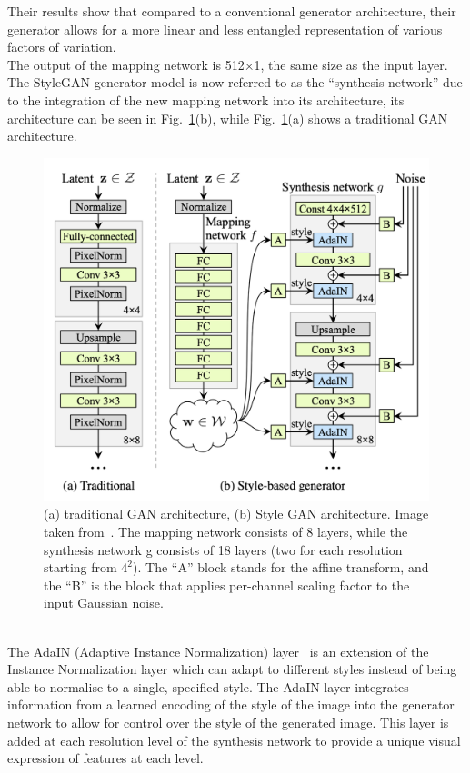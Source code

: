 %
Their results show that compared to a conventional generator architecture, their generator allows for a more linear and less entangled representation of various factors of variation.\\
The output of the mapping network is 512×1, the same size as the input layer. The StyleGAN generator model is now referred to as the “synthesis network” due to the integration of the new mapping network into its architecture, its architecture can be seen in Fig.~\ref{fig:StyleGAN architecture}(b), while Fig.~\ref{fig:StyleGAN architecture}(a) shows a traditional GAN architecture.
\begin{figure}[!ht]
\centering
  \includegraphics[scale=0.5]{figures/styleGAN-generator.png}
  \caption{(a) traditional GAN architecture, (b) Style GAN architecture. Image taken from~\cite{StyleGAN}. The mapping network consists of 8 layers, while the synthesis network g consists of 18 layers (two for each resolution starting from $4^2$). The “A” block stands for the affine transform, and the “B” is the block that applies per-channel scaling factor to the input Gaussian noise.}
  \label{fig:StyleGAN architecture}
\end{figure}
\\
%
\noindent The AdaIN (Adaptive Instance Normalization) layer~\cite{ArbitraryStyleTransfer} is an extension of the Instance Normalization layer which can adapt to different styles instead of being able to normalise to a single, specified style. The AdaIN layer integrates information from a learned encoding of the style of the image into the generator network to allow for control over the style of the generated image. This layer is added at each resolution level of the synthesis network to provide a unique visual expression of features at each level.
